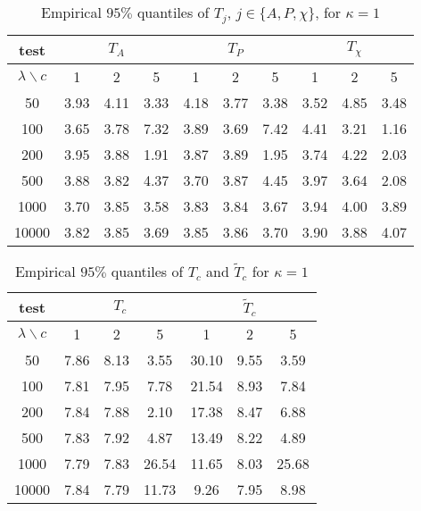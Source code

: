 \documentclass[12pt]{article}
\begin{document}
\begin{table}[t]
\centering
\caption{Empirical $95\%$ quantiles of $T_j$, $j\in\{A,P,\chi\}$, for $\kappa=1$}\label{tab:quantiles.univ}

\begin{tabular}{c|ccc||ccc||ccc}
 test & \multicolumn{3}{c}{$T_A$} & \multicolumn{3}{c}{$T_P$} & \multicolumn{3}{c}{$T_\chi$}\\\hline
$\lambda\backslash c$ & 1 & 2 & 5 & 1 & 2 & 5 & 1 & 2 & 5\\ \hline
 50     & 3.93 & 4.11 & 3.33 & 4.18 & 3.77 & 3.38 & 3.52 & 4.85 & 3.48\\
 100    & 3.65 & 3.78 & 7.32 & 3.89 & 3.69 & 7.42 & 4.41 & 3.21 & 1.16\\
 200    & 3.95 & 3.88 & 1.91 & 3.87 & 3.89 & 1.95 & 3.74 & 4.22 & 2.03\\
 500    & 3.88 & 3.82 & 4.37 & 3.70 & 3.87 & 4.45 & 3.97 & 3.64 & 2.08\\
 1000   & 3.70 & 3.85 & 3.58 & 3.83 & 3.84 & 3.67 & 3.94 & 4.00 & 3.89\\
 10000  & 3.82 & 3.85 & 3.69 & 3.85 & 3.86 & 3.70 & 3.90 & 3.88 & 4.07\\
\hline
\end{tabular}
\end{table}


\begin{table}[t]
\centering
\caption{Empirical $95\%$ quantiles of $T_c$ and $\widetilde{T}_c$ for $\kappa=1$}\label{tab:quantiles.multiv}

\begin{tabular}{c|ccc||ccc}
 test & \multicolumn{3}{c}{$T_c$} & \multicolumn{3}{c}{$\widetilde{T}_c$} \\\hline
$\lambda\backslash c$ & 1 & 2 & 5 & 1 & 2 & 5 \\ \hline
 50     & 7.86 & 8.13 & 3.55  & 30.10 & 9.55 & 3.59\\
 100    & 7.81 & 7.95 & 7.78  & 21.54 & 8.93 & 7.84\\
 200    & 7.84 & 7.88 & 2.10  & 17.38 & 8.47 & 6.88\\
 500    & 7.83 & 7.92 & 4.87  & 13.49 & 8.22 & 4.89\\
 1000   & 7.79 & 7.83 & 26.54 & 11.65 & 8.03 & 25.68\\
 10000  & 7.84 & 7.79 & 11.73 & 9.26  & 7.95 & 8.98\\

\hline
\end{tabular}
\end{table}
\end{document}
